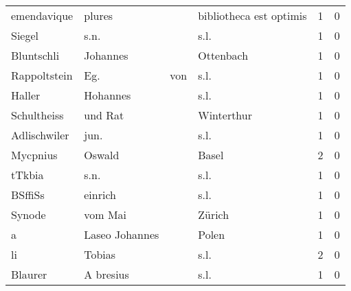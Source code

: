 \begin{tabular}{llllrr}
              emendavique &                             plures &             &                     bibliotheca est optimis &          1 &         0 \\
                   Siegel &                               s.n. &             &                                        s.l. &          1 &         0 \\
               Bluntschli &                           Johannes &             &                                   Ottenbach &          1 &         0 \\
             Rappoltstein &                                Eg. &         von &                                        s.l. &          1 &         0 \\
                   Haller &                           Hohannes &             &                                        s.l. &          1 &         0 \\
              Schultheiss &                            und Rat &             &                                  Winterthur &          1 &         0 \\
             Adlischwiler &                               jun. &             &                                        s.l. &          1 &         0 \\
                 Mycpnius &                             Oswald &             &                                       Basel &          2 &         0 \\
                   tTkbia &                               s.n. &             &                                        s.l. &          1 &         0 \\
                  BSffiSs &                            einrich &             &                                        s.l. &          1 &         0 \\
                   Synode &                            vom Mai &             &                                      Zürich &          1 &         0 \\
                        a &                     Laseo Johannes &             &                                       Polen &          1 &         0 \\
                       li &                             Tobias &             &                                        s.l. &          2 &         0 \\
                  Blaurer &                          A bresius &             &                                        s.l. &          1 &         0 \\

\end{tabular}

